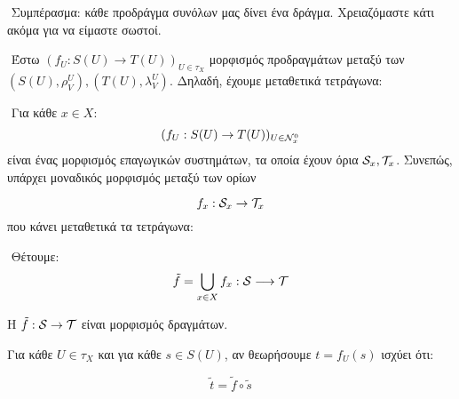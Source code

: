 $ $\newline
Συμπέρασμα: κάθε προδράγμα συνόλων μας δίνει ένα δράγμα. Χρειαζόμαστε κάτι ακόμα για να είμαστε σωστοί.

$ $\newline
Έστω $(f_U: S(U)\rightarrow T(U))_{U\in \tau_X}$ μορφισμός προδραγμάτων μεταξύ των $(S(U),\rho^U_V), (T(U),\lambda^U_V)$. Δηλαδή, έχουμε μεταθετικά τετράγωνα:

\begin{figure}[H]
    \centering
{}
\end{figure}

$ $\newline
Για κάθε $x \in X:$ 
$$(f_U : S(U)\rightarrow T(U))_{U \in \mathcal{N}^0_x}$$ είναι ένας μορφισμός επαγωγικών συστημάτων, τα οποία έχουν όρια $\mathcal{S}_x, \mathcal{T}_x$. Συνεπώς, υπάρχει μοναδικός μορφισμός μεταξύ των ορίων

$$f_x : \mathcal{S}_x \rightarrow \mathcal{T}_x$$ που κάνει μεταθετικά τα τετράγωνα:

\begin{figure}[H]
    \centering
\end{figure}

$ $\newline
Θέτουμε: 
$$\tilde{f} = \bigcup\limits_{x \in X}f_x: \mathcal{S}\longrightarrow \mathcal{T}$$
\vspace*{0.3cm}

\begin{prop}
    Η $\tilde{f}:\mathcal{S}\rightarrow \mathcal{T}$ είναι μορφισμός δραγμάτων.
\end{prop}
\vspace*{0.1cm}
\begin{lemma}Για κάθε $U \in \tau_X$ και για κάθε  $ s \in S(U)$, αν θεωρήσουμε $t = f_U(s)$ ισχύει ότι:

    $$\tilde{t} = \tilde{f} \circ \tilde{s}$$
\end{lemma}

